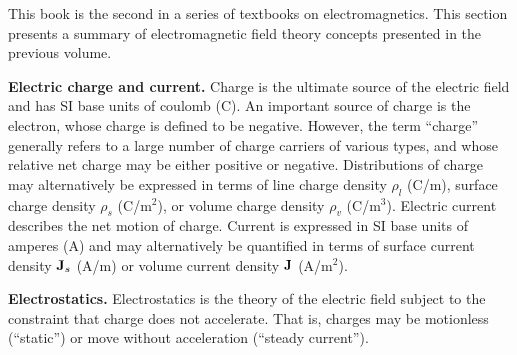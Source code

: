 

\label{m0179_Electromagnetic_Field_Theory_Review} %

This book is the second in a series of textbooks on electromagnetics.
This section presents a summary of electromagnetic field theory concepts presented in the previous volume.

{\bf Electric charge and current.} 
Charge is the ultimate source of the electric field and has SI base units of coulomb (C). 
An important source of charge is the electron, whose charge is defined to be negative.
However, the term ``charge'' generally refers to a large number of charge carriers of various types, and whose relative net charge may be either positive or negative.
Distributions of charge may alternatively be expressed in terms of 
line charge density $\rho_l$ (C/m),           
surface charge density $\rho_s$ (C/m$^2$), or 
volume charge density $\rho_v$ (C/m$^3$).     
Electric current 
describes the net motion of charge.
Current is expressed in SI base units of amperes (A) and may alternatively be quantified in terms of
surface current density ${\bf J}_s$ (A/m) or 
volume current density ${\bf J}$ (A/m$^2$).  

{\bf Electrostatics.}  
Electrostatics is the theory of the electric field subject to the constraint that charge does not accelerate.
That is, charges may be motionless (``static'') or move without acceleration (``steady current'').

